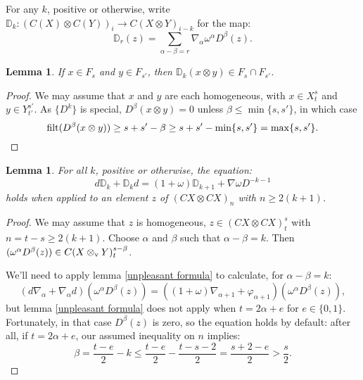 \documentclass[11pt]{amsart}
\theoremstyle{plain}
\newtheorem{lem}[thm]{Lemma}
\theoremstyle{definition}
\let\phi\varphi
\renewcommand{\to}{\longrightarrow}
\theoremstyle{plain}
\newcommand{\twist}{\omega}
\newcommand{\Nabla}{\nabla}
\newcommand{\filt}{\textup{filt}}
\begin{document}
\begin{second quadrant homotopy}
For any $k$, positive or otherwise, write $\mathbb{D}_k:(C(X)\otimes C(Y))_i\to C(X\otimes Y)_{i-k}$ for the map:
\[\mathbb{D}_r(z)= \sum_{\alpha-\beta=r}\Nabla_\alpha\twist^\alpha D^\beta(z).
\]
\begin{lem}\label{DkIsNiceToFiltration}
If $x\in F_s$ and $y\in F_{s'}$, then $\mathbb{D}_k(x\otimes  y)\in F_s\cap F_{s'}$.
\end{lem}
\begin{proof}
We may assume that $x$ and $y$ are each homogeneous, with $x\in X^{s}_{t}$ and $y\in Y^{s'}_{t'}$. As $\{D^k\}$ is special, $D^{\beta}(x\otimes y)=0$ unless $\beta\leq \min\{s,s'\}$, in which case
\[\filt(D^{\beta}(x\otimes y))\geq s+s'-\beta\geq s+s'-\min\{s,s'\}=\max\{s,s'\}.\qedhere\]
\end{proof}
\begin{lem}\label{boundaryVsBBD}
For all $k$, positive or otherwise, the equation:
\[d\mathbb{D}_k+\mathbb{D}_kd= (1+\twist)\mathbb{D}_{k+1}+\Nabla\twist D^{-k-1}\]
holds when applied to an element $z$ of $(CX\otimes CX)_{n}$ with $n\geq 2(k+1)$.
\end{lem}
\begin{proof}
\newcommand{\twolinesum}[2]{\mathop{\sum_{\mathclap{#1}}}_{\mathclap{#2}}}
\newcommand{\onelinesum}[1]{\sum_{\mathclap{#1}}}
We may assume that $ z$ is homogeneous, $z\in (CX\otimes CX)_{t}^{s}$ with $n=t-s\geq2(k+1)$. Choose $\alpha$ and $\beta$ such that $\alpha-\beta=k$. Then $(\twist^\alpha D^\beta(z))\in C(X\otimes_\textup{v} Y)^{s-\beta}_{t}$.

We'll need to apply lemma \ref{unpleasant formula} to calculate, for $\alpha-\beta=k$:
\[(d\Nabla_\alpha+\Nabla_\alpha d)(\twist^\alpha D^\beta(z))=((1+\twist)\Nabla_{\alpha+1}+\phi_{\alpha+1} )(\twist^\alpha D^\beta(z)),\]
but lemma \ref{unpleasant formula} does not apply when $t=2\alpha+e$ for $e\in\{0,1\}$. Fortunately, in that case $D^\beta(z)$ is zero, so the equation holds by default: after all, if $t=2\alpha+e$, our assumed inequality on $n$ implies:
\[\beta=\frac{t-e}{2}-k\leq \frac{t-e}{2}-\frac{t-s-2}{2}=\frac{s+2-e}{2}>\frac{s}{2}.\]


\end{proof}
\end{second quadrant homotopy}
\end{document}
